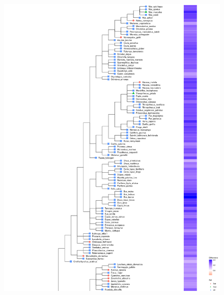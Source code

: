 \documentclass{article}
\begin{document}
\begin{figure}[!h]
\label{supfig:phylogeny_differences_animals}
\centerline{\includegraphics[width=\textwidth]{images/animals_differences_part1}}
\end{figure}
\end{document}
